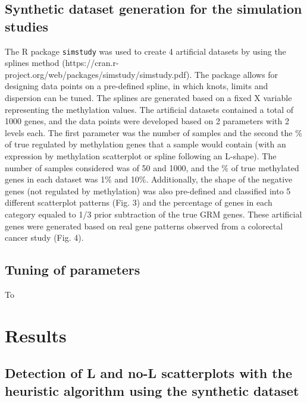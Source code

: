 \documentclass[10pt,letterpaper]{article}
\begin{document}
\hypertarget{synthetic-dataset-generation-for-the-simulation-studies}{%
\subsection{Synthetic dataset generation for the simulation
studies}\label{synthetic-dataset-generation-for-the-simulation-studies}}

The R package \texttt{simstudy} was used to create 4 artificial datasets
by using the splines method
(https://cran.r-project.org/web/packages/simstudy/simstudy.pdf). The
package allows for designing data points on a pre-defined spline, in
which knots, limits and dispersion can be tuned. The splines are
generated based on a fixed X variable representing the methylation
values. The artificial datasets contained a total of 1000 genes, and the
data points were developed based on 2 parameters with 2 levels each. The
first parameter was the number of samples and the second the \% of true
regulated by methylation genes that a sample would contain (with an
expression by methylation scatterplot or spline following an L-shape).
The number of samples considered was of 50 and 1000, and the \% of true
methylated genes in each dataset was 1\% and 10\%. Additionally, the
shape of the negative genes (not regulated by methylation) was also
pre-defined and classified into 5 different scatterplot patterns (Fig.
3) and the percentage of genes in each category equaled to 1/3 prior
subtraction of the true GRM genes. These artificial genes were generated
based on real gene patterns observed from a colorectal cancer study
(Fig. 4).

\hypertarget{tuning-of-parameters}{%
\subsection{Tuning of parameters}\label{tuning-of-parameters}}

To

\hypertarget{results}{%
\section{Results}\label{results}}

\hypertarget{detection-of-l-and-no-l-scatterplots-with-the-heuristic-algorithm-using-the-synthetic-dataset}{%
\subsection{Detection of L and no-L scatterplots with the heuristic
algorithm using the synthetic
dataset}\label{detection-of-l-and-no-l-scatterplots-with-the-heuristic-algorithm-using-the-synthetic-dataset}}
\end{document}
